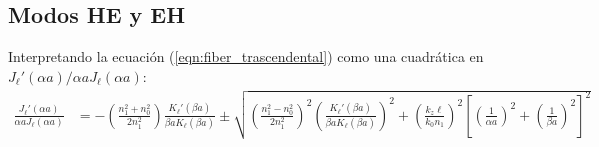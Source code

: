 
\subsection{Modos HE y EH}
Interpretando la ecuación (\ref{eqn:fiber_trascendental}) como una cuadrática en $J_\ell'(\alpha a)/\alpha a J_\ell(\alpha a)$:
\begin{align*}
	\frac{J_\ell'(\alpha a)}{\alpha a J_\ell(\alpha a)} &= -\left(\frac{n_1^2+n_0^2}{2n_1^2}\right) \frac{K_\ell'(\beta a)}{\beta a K_\ell(\beta a)}\pm\sqrt{\left(\frac{n_1^2-n_0^2}{2n_1^2}\right)^2\left(\frac{K_\ell'(\beta a)}{\beta a K_\ell(\beta a)}\right)^2+ \left( \frac{ k_z \ell}{ k_0 n_1} \right)^2\left[ \left(\frac{1}{\alpha a}\right)^2 + \left(\frac{1}{\beta a}\right)^2 \right]^2 }
\end{align*}

